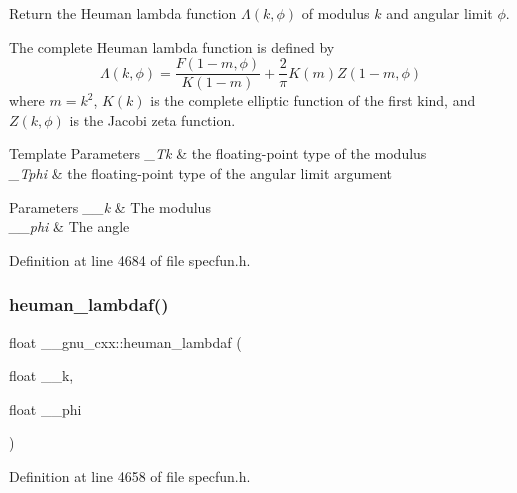 Return the Heuman lambda function $ \Lambda(k,\phi) $ of modulus $ k $ and angular limit $ \phi $.

The complete Heuman lambda function is defined by \[ \Lambda(k,\phi) = \frac{F(1-m,\phi)}{K(1-m)} + \frac{2}{\pi} K(m) Z(1-m,\phi) \] where $ m = k^2 $, $ K(k) $ is the complete elliptic function of the first kind, and $ Z(k,\phi) $ is the Jacobi zeta function.


\begin{DoxyTemplParams}{Template Parameters}
{\em \+\_\+\+Tk} & the floating-\/point type of the modulus \\
\hline
{\em \+\_\+\+Tphi} & the floating-\/point type of the angular limit argument \\
\hline
\end{DoxyTemplParams}

\begin{DoxyParams}{Parameters}
{\em \+\_\+\+\_\+k} & The modulus \\
\hline
{\em \+\_\+\+\_\+phi} & The angle \\
\hline
\end{DoxyParams}


Definition at line 4684 of file specfun.\+h.

\mbox{\label{group__gnu__math__spec__func_ga10cf5d54d985aa3a58cb197601040ac8}} 
\subsubsection{\texorpdfstring{heuman\+\_\+lambdaf()}{heuman\_lambdaf()}}
{\footnotesize\ttfamily float \+\_\+\+\_\+gnu\+\_\+cxx\+::heuman\+\_\+lambdaf (\begin{DoxyParamCaption}\item[{float}]{\+\_\+\+\_\+k,  }\item[{float}]{\+\_\+\+\_\+phi }\end{DoxyParamCaption})\hspace{0.3cm}{\ttfamily [inline]}}



Definition at line 4658 of file specfun.\+h.

\mbox{\label{group__gnu__math__spec__func_gadadaeb83b3d9c2fccd33ab8ec3188df5}} 
